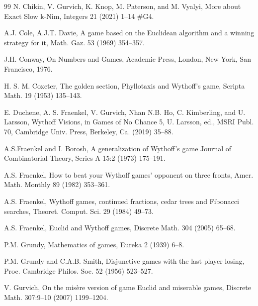 \documentclass{article}
\theoremstyle{definition}
\begin{document}
\begin{thebibliography}{99}
N. Chikin, V. Gurvich, K. Knop, M. Paterson, 
and M. Vyalyi, 
More about Exact Slow k-Nim, 
Integers 21 (2021) 1--14  \#G4.   

A.J. Cole, A.J.T. Davie, 
A game based on the Euclidean algorithm 
and a winning strategy for it, Math. Gaz. 53 (1969) 354--357.

J.H. Conway, On Numbers and Games, Academic Press, 
London, New York, San Francisco, 1976.

H. S. M. Coxeter, 
The golden section, Phyllotaxis and Wythoff's game, 
Scripta Math. 19 (1953) 135--143. 


E. Duchene, A. S. Fraenkel, V. Gurvich,
Nhan N.B. Ho, C. Kimberling, and U. Larsson, 
Wythoff Visions,  in Games of No Chance 5, 
U. Larsson, ed.,  MSRI Publ. 70, 
Cambridge Univ. Press, Berkeley, Ca. (2019)  35--88.

A.S.Fraenkel and I. Borosh, 
A generalization of Wythoff's game
Journal of Combinatorial Theory, Series A 15:2 (1973) 175--191.

A.S. Fraenkel, 
How to beat your Wythoff games’ opponent on three fronts, 
Amer. Math. Monthly 89 (1982) 353--361.

A.S. Fraenkel, Wythoff games, continued fractions, 
cedar trees and Fibonacci searches, 
Theoret. Comput. Sci. 29 (1984) 49--73.

A.S. Fraenkel, 
Euclid and Wythoff games, Discrete Math. 304 (2005) 65–68.


P.M. Grundy, Mathematics of games, Eureka 2 (1939) 6--8.

P.M. Grundy and C.A.B. Smith, 
Disjunctive games with the last player losing, 
Proc. Cambridge Philos. Soc. 52 (1956) 523--527.

V. Gurvich, 
On the misère version of game Euclid and miserable games, 
Discrete Math. 307:9–10 (2007) 1199--1204.



\end{thebibliography}
\end{document}
